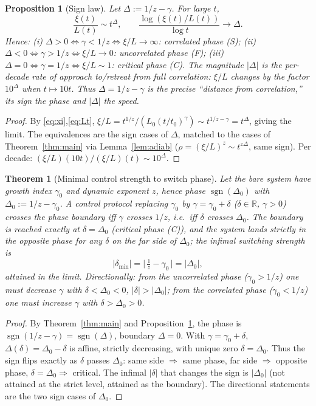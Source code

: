 \documentclass{amsart}
\newtheorem{theorem}{Theorem}
\newtheorem{proposition}{Proposition}
\theoremstyle{definition}
\newcommand{\asymp}{\sim}
\begin{document}
\begin{proposition}[Sign law]\label{prop:sign}
Let $\Delta:=1/z-\gamma$. For large $t$,
\[
  \frac{\xi(t)}{L(t)}\asymp t^{\Delta},\qquad
  \frac{\log(\xi(t)/L(t))}{\log t}\to\Delta .
\]
Hence: (i) $\Delta>0\iff\gamma<1/z\iff\xi/L\to\infty$: correlated phase (S);
(ii) $\Delta<0\iff\gamma>1/z\iff\xi/L\to0$: uncorrelated phase (F);
(iii) $\Delta=0\iff\gamma=1/z\iff\xi/L\asymp1$: critical phase (C).
The magnitude $|\Delta|$ is the per-decade rate of approach to/retreat from full
correlation: $\xi/L$ changes by the factor $10^{\Delta}$ when $t\mapsto10t$. Thus
$\Delta=1/z-\gamma$ is the precise ``distance from correlation,'' its sign the phase
and $|\Delta|$ the speed.
\end{proposition}
\begin{proof}
By \eqref{eq:xi},\eqref{eq:Lt}, $\xi/L=t^{1/z}/(L_0(t/t_0)^{\gamma})
\asymp t^{1/z-\gamma}=t^{\Delta}$, giving the limit. The equivalences are the sign
cases of $\Delta$, matched to the cases of Theorem~\ref{thm:main} via
Lemma~\ref{lem:adiab} ($\rho=(\xi/L)^z\asymp t^{z\Delta}$, same sign). Per decade:
$(\xi/L)(10t)\big/(\xi/L)(t)\asymp10^{\Delta}$.
\end{proof}

\begin{theorem}[Minimal control strength to switch phase]\label{thm:control}
Let the bare system have growth index $\gamma_0$ and dynamic exponent $z$, hence
phase $\operatorname{sgn}(\Delta_0)$ with $\Delta_0:=1/z-\gamma_0$. A control
protocol replacing $\gamma_0$ by $\gamma=\gamma_0+\delta$ ($\delta\in\mathbb R$,
$\gamma>0$) crosses the phase boundary iff $\gamma$ crosses $1/z$, i.e.\ iff
$\delta$ crosses $\Delta_0$. The boundary is reached exactly at $\delta=\Delta_0$
(critical phase (C)), and the system lands strictly in the opposite phase for any
$\delta$ on the far side of $\Delta_0$; the infimal switching strength is
\begin{equation}\label{eq:thresh}
  |\delta_{\min}|=\big|\,\tfrac1z-\gamma_0\,\big|=|\Delta_0|,
\end{equation}
attained in the limit. Directionally: from the uncorrelated phase
($\gamma_0>1/z$) one must \emph{decrease} $\gamma$ with
$\delta<\Delta_0<0$, $|\delta|>|\Delta_0|$; from the correlated phase
($\gamma_0<1/z$) one must \emph{increase} $\gamma$ with $\delta>\Delta_0>0$.
\end{theorem}
\begin{proof}
By Theorem~\ref{thm:main} and Proposition~\ref{prop:sign}, the phase is
$\operatorname{sgn}(1/z-\gamma)=\operatorname{sgn}(\Delta)$, boundary $\Delta=0$.
With $\gamma=\gamma_0+\delta$, $\Delta(\delta)=\Delta_0-\delta$ is affine, strictly
decreasing, with unique zero $\delta=\Delta_0$. Thus the sign flips exactly as
$\delta$ passes $\Delta_0$: same side $\Rightarrow$ same phase, far side
$\Rightarrow$ opposite phase, $\delta=\Delta_0\Rightarrow$ critical. The infimal
$|\delta|$ that changes the sign is $|\Delta_0|$ (not attained at the strict level,
attained as the boundary). The directional statements are the two sign cases of
$\Delta_0$.
\end{proof}
\end{document}
